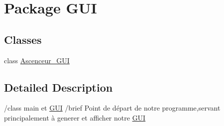 \hypertarget{namespace_g_u_i}{}\section{Package G\+UI}
\label{namespace_g_u_i}
\subsection*{Classes}
\begin{DoxyCompactItemize}
\item 
class \mbox{\hyperlink{class_g_u_i_1_1_ascenceur___g_u_i}{Ascenceur\+\_\+\+G\+UI}}
\end{DoxyCompactItemize}


\subsection{Detailed Description}
/class main et \mbox{\hyperlink{namespace_g_u_i}{G\+UI}} /brief Point de départ de notre programme,servant principalement à generer et afficher notre \mbox{\hyperlink{namespace_g_u_i}{G\+UI}} 